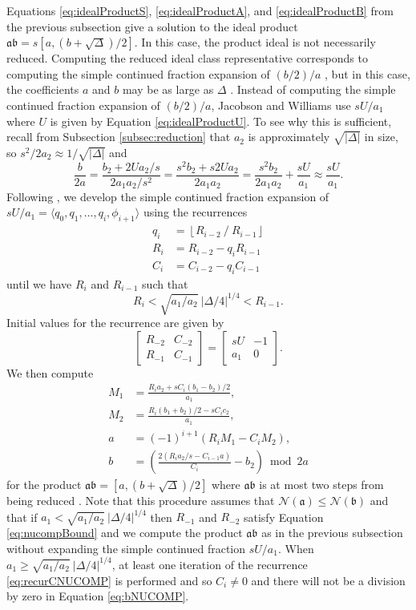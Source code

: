 \documentclass{ucalgthes1}
\theoremstyle{definition}
\newcommand{\matrixtt}[4]{\left[ \begin{array}{rr} #1 & #2 \\ #3 & #4 \end{array} \right]}
\newcommand{\floor}[1]{\left\lfloor #1 \right\rfloor}
\newcommand{\ideal}{\mathfrak}
\begin{document}
Equations \ref{eq:idealProductS}, \ref{eq:idealProductA}, and \ref{eq:idealProductB} from the previous subsection give a solution to the ideal product $\ideal a \ideal b = s[a, (b+\sqrt\Delta)/2]$.  In this case, the product ideal is not necessarily reduced.  Computing the reduced ideal class representative corresponds to computing the simple continued fraction expansion of $(b/2)/a$ \cite[p.119]{Jacobson2009}, but in this case, the coefficients $a$ and $b$ may be as large as $\Delta$ \cite[p.118]{Jacobson2009}.  Instead of computing the simple continued fraction expansion of $(b/2)/a$, Jacobson and Williams \cite[p.119]{Jacobson2009} use $sU/a_1$ where $U$ is given by Equation \ref{eq:idealProductU}.  To see why this is sufficient, recall from Subsection \ref{subsec:reduction} that $a_2$ is approximately $\sqrt{|\Delta|}$ in size, so $s^2 / 2 a_2 \approx 1 / \sqrt{|\Delta|}$ and
\[
	\frac{b}{2a} = \frac{b_2 + 2Ua_2/s}{2a_1a_2/s^2} 
	= \frac{s^2 b_2+s2Ua_2}{2a_1a_2}
	= \frac{s^2b_2}{2a_1a_2} + \frac{sU}{a_1}
	\approx \frac{sU}{a_1}.
\]
Following \cite[pp.120-121]{Jacobson2009}, we develop the simple continued fraction expansion of $sU/a_1 = \langle q_0, q_1, \dots, q_i, \phi_{i+1} \rangle$ using the recurrences
\begin{align}
	q_i &= \floor{R_{i-2} ~/~ R_{i-1}} \label{eq:recurqNUCOMP} \\
	R_i &= R_{i-2} - q_i R_{i-1} \label{eq:recurRNUCOMP} \\
	C_i &= C_{i-2} - q_i C_{i-1} \label{eq:recurCNUCOMP}
\end{align}
until we have $R_i$ and $R_{i-1}$ such that
\begin{equation}
\label{eq:nucompBound}
	R_i < \sqrt{a_1/a_2} ~ |\Delta/4|^{1/4} < R_{i-1}.
\end{equation}
Initial values for the recurrence are given by
\[
	\matrixtt{R_{-2}}{C_{-2}}{R_{-1}}{C_{-1}} = \matrixtt{sU}{-1}{a_1}{0}.
\]
We then compute
\begin{align}
	M_1 &= \frac{R_i a_2 + sC_i(b_1-b_2)/2}{a_1}, \nonumber \\
	M_2 &= \frac{R_i (b_1+b_2)/2 - s C_i c_2}{a_1}, \nonumber \\
	a &= (-1)^{i+1} (R_i M_1  - C_i M_2), \nonumber \\
	b &= \left( \frac{2(R_i a_2 /s - C_{i-1} a)}{C_i} - b_2 \right) \bmod 2a \label{eq:bNUCOMP}
\end{align}
for the product $\mathfrak a \mathfrak b = [a, (b + \sqrt\Delta)/2]$ where $\ideal a \ideal b$ is at most two steps from being reduced \cite[p.122]{Jacobson2009}.  Note that this procedure assumes that $\mathcal N(\mathfrak a) \le \mathcal N(\mathfrak b)$ and that if $a_1 < \sqrt{a_1/a_2} ~ |\Delta/4|^{1/4}$ then $R_{-1}$ and $R_{-2}$ satisfy Equation \ref{eq:nucompBound} and we compute the product $\mathfrak a \mathfrak b$ as in the previous subsection without expanding the simple continued fraction $sU/a_1$.  When $a_1 \ge \sqrt{a_1/a_2} ~ |\Delta/4|^{1/4}$, at least one iteration of the recurrence \ref{eq:recurCNUCOMP} is performed and so $C_i \neq 0$ and there will not be a division by zero in Equation \ref{eq:bNUCOMP}.
\end{document}
